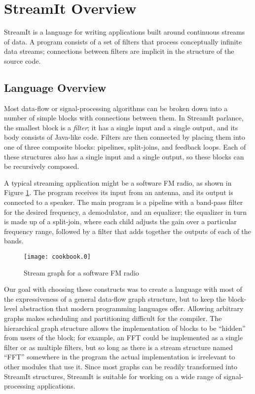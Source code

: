 \section{StreamIt Overview}

StreamIt is a language for writing applications built around
continuous streams of data.  A program consists of a set of filters
that process conceptually infinite data streams; connections between
filters are implicit in the structure of the source code.

\subsection{Language Overview}

Most data-flow or signal-processing algorithms can be broken down into
a number of simple blocks with connections between them.  In StreamIt
parlance, the smallest block is a \emph{filter}; it has a single input
and a single output, and its body consists of Java-like code.  Filters
are then connected by placing them into one of three composite blocks:
pipelines, split-joins, and feedback loops.  Each of these structures
also has a single input and a single output, so these blocks can be
recursively composed.

A typical streaming application might be a software FM radio, as shown
in Figure \ref{fig:fm-radio}.  The program receives its input from an
antenna, and its output is connected to a speaker.  The main program
is a pipeline with a band-pass filter for the desired frequency, a
demodulator, and an equalizer; the equalizer in turn is made up of a
split-join, where each child adjusts the gain over a particular
frequency range, followed by a filter that adds together the outputs
of each of the bands.

\begin{figure}[htbp]
  \begin{center}
    \texttt{[image: cookbook.0]}
    \caption{Stream graph for a software FM radio}
    \label{fig:fm-radio}
  \end{center}
\end{figure}

Our goal with choosing these constructs was to create a language with
most of the expressiveness of a general data-flow graph structure, but
to keep the block-level abstraction that modern programming languages
offer.  Allowing arbitrary graphs makes scheduling and partitioning
difficult for the compiler.  The hierarchical graph structure allows
the implementation of blocks to be ``hidden'' from users of the block;
for example, an FFT could be implemented as a single filter or as
multiple filters, but so long as there is a stream structure named
``FFT'' somewhere in the program the actual implementation is
irrelevant to other modules that use it.  Since most graphs can be
readily transformed into StreamIt structures, StreamIt is suitable for
working on a wide range of signal-processing applications.

